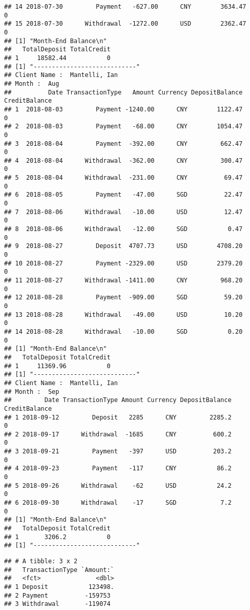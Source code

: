\documentclass[]{article}
\newenvironment{Shaded}{\begin{snugshade}}{\end{snugshade}}
\newcommand{\KeywordTok}[1]{\textcolor[rgb]{0.13,0.29,0.53}{\textbf{#1}}}
\newcommand{\StringTok}[1]{\textcolor[rgb]{0.31,0.60,0.02}{#1}}
\newcommand{\OperatorTok}[1]{\textcolor[rgb]{0.81,0.36,0.00}{\textbf{#1}}}
\newcommand{\NormalTok}[1]{#1}
\begin{document}
\begin{verbatim}
## 14 2018-07-30         Payment   -627.00      CNY        3634.47             0
## 15 2018-07-30      Withdrawal  -1272.00      USD        2362.47             0
## [1] "Month-End Balance\n"
##   TotalDeposit TotalCredit
## 1     18582.44           0
## [1] "----------------------------"
## Client Name :  Mantelli, Ian 
## Month :  Aug 
##          Date TransactionType   Amount Currency DepositBalance CreditBalance
## 1  2018-08-03         Payment -1240.00      CNY        1122.47             0
## 2  2018-08-03         Payment   -68.00      CNY        1054.47             0
## 3  2018-08-04         Payment  -392.00      CNY         662.47             0
## 4  2018-08-04      Withdrawal  -362.00      CNY         300.47             0
## 5  2018-08-04      Withdrawal  -231.00      CNY          69.47             0
## 6  2018-08-05         Payment   -47.00      SGD          22.47             0
## 7  2018-08-06      Withdrawal   -10.00      USD          12.47             0
## 8  2018-08-06      Withdrawal   -12.00      SGD           0.47             0
## 9  2018-08-27         Deposit  4707.73      USD        4708.20             0
## 10 2018-08-27         Payment -2329.00      USD        2379.20             0
## 11 2018-08-27      Withdrawal -1411.00      CNY         968.20             0
## 12 2018-08-28         Payment  -909.00      SGD          59.20             0
## 13 2018-08-28      Withdrawal   -49.00      USD          10.20             0
## 14 2018-08-28      Withdrawal   -10.00      SGD           0.20             0
## [1] "Month-End Balance\n"
##   TotalDeposit TotalCredit
## 1     11369.96           0
## [1] "----------------------------"
## Client Name :  Mantelli, Ian 
## Month :  Sep 
##         Date TransactionType Amount Currency DepositBalance CreditBalance
## 1 2018-09-12         Deposit   2285      CNY         2285.2             0
## 2 2018-09-17      Withdrawal  -1685      CNY          600.2             0
## 3 2018-09-21         Payment   -397      USD          203.2             0
## 4 2018-09-23         Payment   -117      CNY           86.2             0
## 5 2018-09-26      Withdrawal    -62      USD           24.2             0
## 6 2018-09-30      Withdrawal    -17      SGD            7.2             0
## [1] "Month-End Balance\n"
##   TotalDeposit TotalCredit
## 1       3206.2           0
## [1] "----------------------------"
\end{verbatim}

\begin{Shaded}
\end{Shaded}

\begin{verbatim}
## # A tibble: 3 x 2
##   TransactionType `Amount:`
##   <fct>               <dbl>
## 1 Deposit           123498.
## 2 Payment          -159753 
## 3 Withdrawal       -119074
\end{verbatim}
\end{document}

